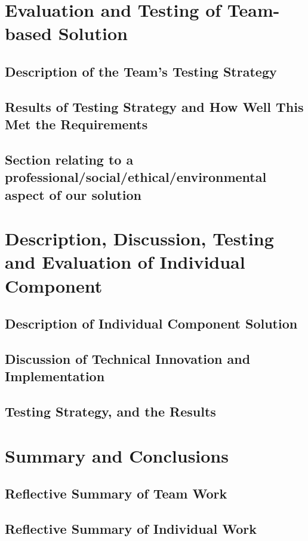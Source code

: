 \documentclass[a4paper]{report}
\begin{document}
\chapter{Evaluation and Testing of Team-based Solution} 
\section{Description of the Team's Testing Strategy}
\section{Results of Testing Strategy and How Well This Met the Requirements}
\section{Section relating to a professional/social/ethical/environmental aspect of our solution} %

\chapter{Description, Discussion, Testing and Evaluation of Individual Component}
\section{Description of Individual Component Solution}
\section{Discussion of Technical Innovation and Implementation}
\section{Testing Strategy, and the Results}

\chapter{Summary and Conclusions}
\section{Reflective Summary of Team Work}
\section{Reflective Summary of Individual Work}
\end{document}

